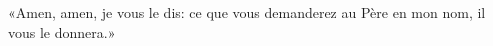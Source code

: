 \encetemps \jesusdisciples
	«Amen, amen, je vous le dis:
	ce que vous demanderez au Père en mon nom, il vous le donnera.»
